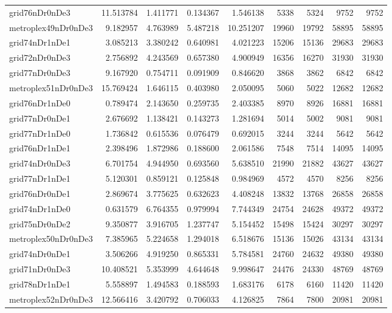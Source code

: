 \begin{longtable}{|l|r|r|r|r|r|r|r|r|}
grid76nDr0nDe3 & 11.513784 & 1.411771 & 0.134367 & 1.546138 & 5338 & 5324 & 9752 & 9752 \\
metroplex49nDr0nDe3 & 9.182957 & 4.763989 & 5.487218 & 10.251207 & 19960 & 19792 & 58895 & 58895 \\
grid74nDr1nDe1 & 3.085213 & 3.380242 & 0.640981 & 4.021223 & 15206 & 15136 & 29683 & 29683 \\
grid72nDr0nDe3 & 2.756892 & 4.243569 & 0.657380 & 4.900949 & 16356 & 16270 & 31930 & 31930 \\
grid77nDr0nDe3 & 9.167920 & 0.754711 & 0.091909 & 0.846620 & 3868 & 3862 & 6842 & 6842 \\
metroplex51nDr0nDe3 & 15.769424 & 1.646115 & 0.403980 & 2.050095 & 5060 & 5022 & 12682 & 12682 \\
grid76nDr1nDe0 & 0.789474 & 2.143650 & 0.259735 & 2.403385 & 8970 & 8926 & 16881 & 16881 \\
grid77nDr0nDe1 & 2.676692 & 1.138421 & 0.143273 & 1.281694 & 5014 & 5002 & 9081 & 9081 \\
grid77nDr1nDe0 & 1.736842 & 0.615536 & 0.076479 & 0.692015 & 3244 & 3244 & 5642 & 5642 \\
grid76nDr1nDe1 & 2.398496 & 1.872986 & 0.188600 & 2.061586 & 7548 & 7514 & 14095 & 14095 \\
grid74nDr0nDe3 & 6.701754 & 4.944950 & 0.693560 & 5.638510 & 21990 & 21882 & 43627 & 43627 \\
grid77nDr1nDe1 & 5.120301 & 0.859121 & 0.125848 & 0.984969 & 4572 & 4570 & 8256 & 8256 \\
grid76nDr0nDe1 & 2.869674 & 3.775625 & 0.632623 & 4.408248 & 13832 & 13768 & 26858 & 26858 \\
grid74nDr1nDe0 & 0.631579 & 6.764355 & 0.979994 & 7.744349 & 24754 & 24628 & 49372 & 49372 \\
grid75nDr0nDe2 & 9.350877 & 3.916705 & 1.237747 & 5.154452 & 15498 & 15424 & 30297 & 30297 \\
metroplex50nDr0nDe3 & 7.385965 & 5.224658 & 1.294018 & 6.518676 & 15136 & 15026 & 43134 & 43134 \\
grid74nDr0nDe1 & 3.506266 & 4.919250 & 0.865331 & 5.784581 & 24760 & 24632 & 49380 & 49380 \\
grid71nDr0nDe3 & 10.408521 & 5.353999 & 4.644648 & 9.998647 & 24476 & 24330 & 48769 & 48769 \\
grid78nDr1nDe1 & 5.558897 & 1.494583 & 0.188593 & 1.683176 & 6178 & 6160 & 11420 & 11420 \\
metroplex52nDr0nDe3 & 12.566416 & 3.420792 & 0.706033 & 4.126825 & 7864 & 7800 & 20981 & 20981 \\

\end{longtable}
